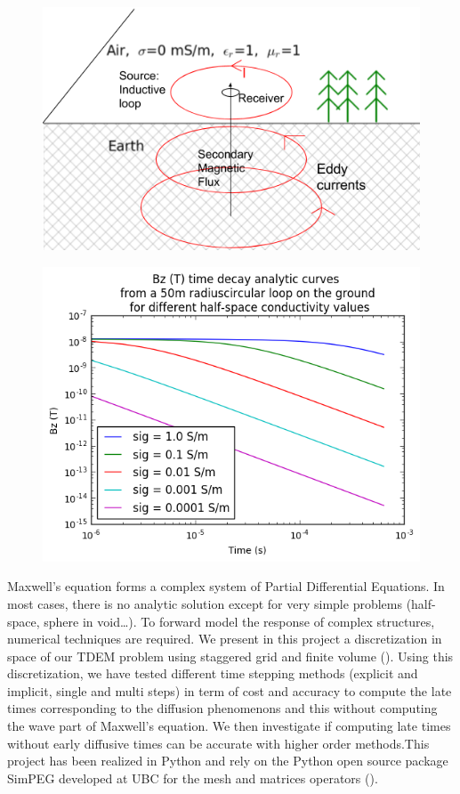 \documentclass[twoside]{article}
\begin{document}
\begin{figure}[!ht]
\centering
\begin{minipage}{0.5\textwidth}
  \centering
  \includegraphics[width=.9\linewidth]{./figures/TDEM_quickdraw.png}
  \label{TDEM_quickdraw}
\end{minipage}%
\begin{minipage}{.5\textwidth}
  \centering
  \includegraphics[width=.9\linewidth]{./figures/AnalyticCurve.png}
  \label{DecayCurves}
\end{minipage}
\end{figure}

Maxwell's equation forms a complex system of Partial Differential Equations. In most cases, there is no analytic solution except for very simple problems (half-space, sphere in void…). To forward model the response of complex structures, numerical techniques are required. We present in this project a discretization in space of our TDEM problem using staggered grid and finite volume (\cite{Haber:2014}). Using this discretization, we have tested different time stepping methods (explicit and implicit, single and multi steps) in term of cost and accuracy to compute the late times corresponding to the diffusion phenomenons and this without computing the wave part of Maxwell's equation. We then investigate if computing late times without early diffusive times can be accurate with higher order methods.This project has been realized in Python and rely on the Python open source package SimPEG developed at UBC for the mesh and matrices operators (\cite{CKH+:2015}).
\end{document}
